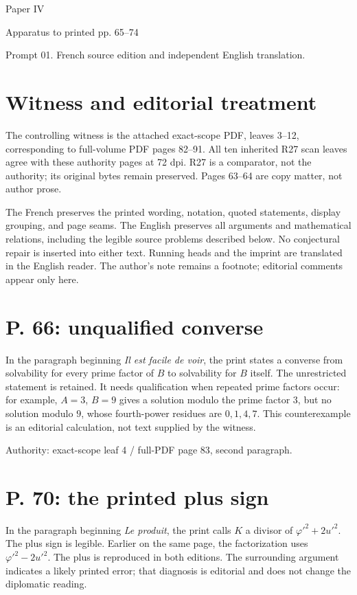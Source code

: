 \documentclass[11pt]{article}
\begin{document}
{\LARGE Paper IV}\par
{\large Apparatus to printed pp. 65–74}\par
Prompt 01. French source edition and independent English translation.

\section*{Witness and editorial treatment}
The controlling witness is the attached exact-scope PDF, leaves 3–12, corresponding
to full-volume PDF pages 82–91. All ten inherited R27 scan leaves agree with these
authority pages at 72 dpi. R27 is a comparator, not the authority; its original
bytes remain preserved. Pages 63–64 are copy matter, not author prose.

The French preserves the printed wording, notation, quoted statements, display
grouping, and page seams. The English preserves all arguments and mathematical
relations, including the legible source problems described below. No conjectural
repair is inserted into either text. Running heads and the imprint are translated
in the English reader. The author’s note remains a footnote; editorial comments
appear only here.

\section*{P. 66: unqualified converse}
In the paragraph beginning \emph{Il est facile de voir}, the print states a converse
from solvability for every prime factor of $B$ to solvability for $B$ itself.
The unrestricted statement is retained. It needs qualification when repeated prime
factors occur: for example, $A=3$, $B=9$ gives a solution modulo the prime factor $3$,
but no solution modulo $9$, whose fourth-power residues are $0,1,4,7$.
This counterexample is an editorial calculation, not text supplied by the witness.

Authority: exact-scope leaf 4 / full-PDF page 83, second paragraph.

\section*{P. 70: the printed plus sign}
In the paragraph beginning \emph{Le produit}, the print calls $K$ a divisor of
$\varphi'^2+2u'^2$. The plus sign is legible. Earlier on the same page, the factorization
uses $\varphi'^2-2u'^2$. The plus is reproduced in both editions. The surrounding
argument indicates a likely printed error; that diagnosis is editorial and does
not change the diplomatic reading.
\end{document}

